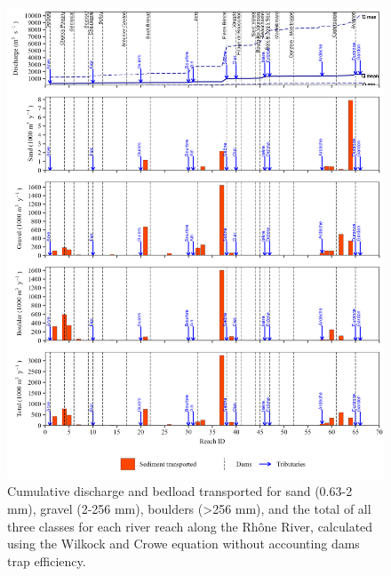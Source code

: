 \documentclass[
]{book}
\begin{document}
\begin{figure}
\includegraphics[width=26.24in]{img/res_cascade/res_E0_eW&C_noDams/plots_transp-silt/transp_res_sum_hy_E0_eW&C_noDams} \caption{Cumulative discharge and bedload transported for sand (0.63-2 mm), gravel (2-256 mm), boulders (>256 mm), and the total of all three classes for each river reach along the Rhône River, calculated using the Wilkock and Crowe equation without accounting dams trap efficiency.}\label{fig:TrE0eW}
\end{figure}
\end{document}
